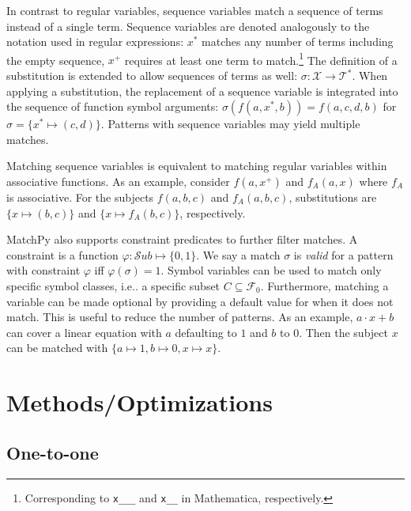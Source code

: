 \documentclass[conference,compsoc]{IEEEtran}
\makeatletter
\DeclareRobustCommand\onedot{\futurelet\@let@token\@onedot}
\def\@onedot{\ifx\@let@token.\else.\null\fi\xspace}
\def\ie{{i.e}\onedot} \def\Ie{{I.e}\onedot}
\newcommand{\termset}{\mathcal{T}}
\newcommand{\funcset}{\mathcal{F}}
\newcommand{\varset}{\mathcal{X}}
\newcommand{\substs}{\mathcal{S}ub}
\makeatother
\begin{document}
In contrast to regular variables, sequence variables match a sequence of terms instead of a single term.
Sequence variables are denoted analogously to the notation used in regular expressions:
$x^*$ matches any number of terms including the empty sequence, $x^+$ requires at least one term to match.\footnote{Corresponding to \texttt{x\_\_\_} and \texttt{x\_\_} in Mathematica, respectively.}
The definition of a substitution is extended to allow sequences of terms as well: $\sigma\colon \varset \rightarrow \termset^*$.
When applying a substitution, the replacement of a sequence variable is integrated into the sequence of function symbol arguments: $\sigma(f(a, x^*, b)) = f(a, c, d, b)$ for $\sigma = \{ x^* \mapsto (c, d) \}$.
Patterns with sequence variables may yield multiple matches.

Matching sequence variables is equivalent to matching regular variables within associative functions.
As an example, consider $f(a, x^+)$ and $f_A(a, x)$ where $f_A$ is associative.
For the subjects $f(a, b, c)$ and $f_A(a, b, c)$, substitutions are $\{ x \mapsto (b, c) \}$ and $\{ x \mapsto f_A(b, c) \}$, respectively.

MatchPy also supports constraint predicates to further filter matches.
A constraint is a function $\varphi\colon \substs \mapsto \{ 0, 1 \}$.
We say a match $\sigma$ is \emph{valid} for a pattern with constraint $\varphi$ iff $\varphi(\sigma) = 1$.
Symbol variables can be used to match only specific symbol classes, \ie a specific subset $C \subseteq \funcset_0$.
Furthermore, matching a variable can be made optional by providing a default value for when it does not match.
This is useful to reduce the number of patterns.
As an example, $a \cdot x + b$ can cover a linear equation with $a$ defaulting to $1$ and $b$ to $0$. Then the subject $x$ can be matched with $\{ a \mapsto 1, b \mapsto 0, x \mapsto x \}$.

\section{Methods/Optimizations}
\subsection{One-to-one}
\end{document}
